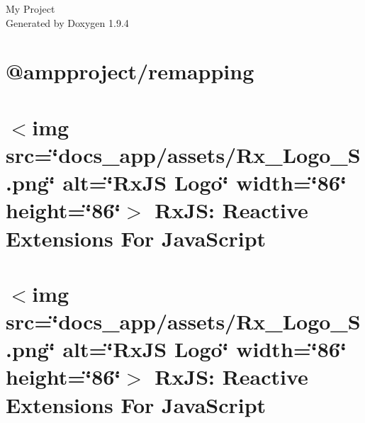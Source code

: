 \documentclass[twoside]{book}
\newcommand{\+}{\discretionary{\mbox{\scriptsize$\hookleftarrow$}}{}{}}
\newcommand{\clearemptydoublepage}{%
    \newpage{\pagestyle{empty}\cleardoublepage}%
  }
\begin{document}
  \raggedbottom
    \hypersetup{pageanchor=false,
                bookmarksnumbered=true,
                pdfencoding=unicode
               }
  \begin{titlepage}
  \vspace*{7cm}
  \begin{center}%
  {\Large My Project}\\
  \vspace*{1cm}
  {\large Generated by Doxygen 1.9.4}\\
  \end{center}
  \end{titlepage}
  \clearemptydoublepage
  \tableofcontents
  \clearemptydoublepage
  \hypersetup{pageanchor=true}
\chapter{@ampproject/remapping}
\label{md__c___users_vaishnavi_jadhav__desktop__developer_code_mean_stack_example_client_node_modules__9e09e3baf1727cb133459b152ff7edd0}

\chapter{\texorpdfstring{$<$}{<}img src=\char`\"{}docs\+\_\+app/assets/\+Rx\+\_\+\+Logo\+\_\+\+S.\+png\char`\"{} alt=\char`\"{}\+Rx\+JS Logo\char`\"{} width=\char`\"{}86\char`\"{} height=\char`\"{}86\char`\"{}\texorpdfstring{$>$}{>} Rx\+JS\+: Reactive Extensions For Java\+Script}
\label{md__c___users_vaishnavi_jadhav__desktop__developer_code_mean_stack_example_client_node_modules__0e56ddcf9291325875e9bb5dab53cca0}

\chapter{\texorpdfstring{$<$}{<}img src=\char`\"{}docs\+\_\+app/assets/\+Rx\+\_\+\+Logo\+\_\+\+S.\+png\char`\"{} alt=\char`\"{}\+Rx\+JS Logo\char`\"{} width=\char`\"{}86\char`\"{} height=\char`\"{}86\char`\"{}\texorpdfstring{$>$}{>} Rx\+JS\+: Reactive Extensions For Java\+Script}
\label{md__c___users_vaishnavi_jadhav__desktop__developer_code_mean_stack_example_client_node_modules__bbddd5cc85070dbacf2c9e6246e96249}

\end{document}
